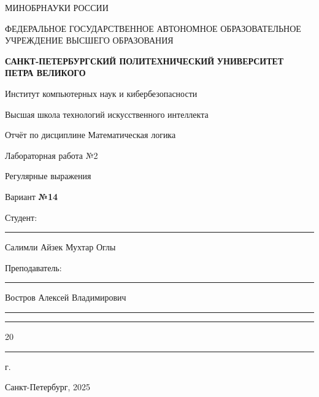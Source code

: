 \documentclass[areasetadvanced]{scrartcl}
\begin{document}
\sloppy
	\thispagestyle{empty}
	\begin{center}
		\large{МИНОБРНАУКИ РОССИИ} \par
		\vspace{0.3cm}
		\normalsize
		{ФЕДЕРАЛЬНОЕ ГОСУДАРСТВЕННОЕ АВТОНОМНОЕ ОБРАЗОВАТЕЛЬНОЕ УЧРЕЖДЕНИЕ ВЫСШЕГО ОБРАЗОВАНИЯ} \par
		\vspace{0.3cm}
		\textbf{\guillemotleft САНКТ-ПЕТЕРБУРГСКИЙ ПОЛИТЕХНИЧЕСКИЙ}
		\textbf{УНИВЕРСИТЕТ ПЕТРА ВЕЛИКОГО\guillemotright} \par
		\vspace{0.3cm}
		{Институт компьютерных наук и кибербезопасности}\par
		{Высшая школа технологий искусственного интеллекта}\par
	\end{center}
	\vfill
	\begin{center}
		{\large Отчёт по дисциплине \guillemotleft Математическая логика\guillemotright}\par
		{\huge   Лабораторная работа №2 
		
		\guillemotleft Регулярные выражения\guillemotright}\par
            {\huge Вариант \textbf{№14}}
         
	\end{center}
	\vfill
	\begin{flushleft}
		Студент: \hspace{1.8cm} \rule[0pt]{2.5cm}{0.5pt}\hfill Салимли Айзек Мухтар Оглы\par
		\vspace{1.5cm}
		Преподаватель: \hspace{0.55cm} \rule[0pt]{2.5cm}{0.5pt}\hfill  Востров Алексей Владимирович
	\end{flushleft}
	\vspace{0.5cm}
	\begin{flushright}
		\guillemotleft \rule[0pt]{0.8cm}{0.5pt}\guillemotright \rule[0pt]{2cm}{0.5pt} 20\rule[0pt]{0.5cm}{0.5pt} г.
	\end{flushright}
	\vfill
	\begin{center}
		Санкт-Петербург, 2025
	\end{center}
	\newpage
	\tableofcontents
	\newpage
\end{document}
